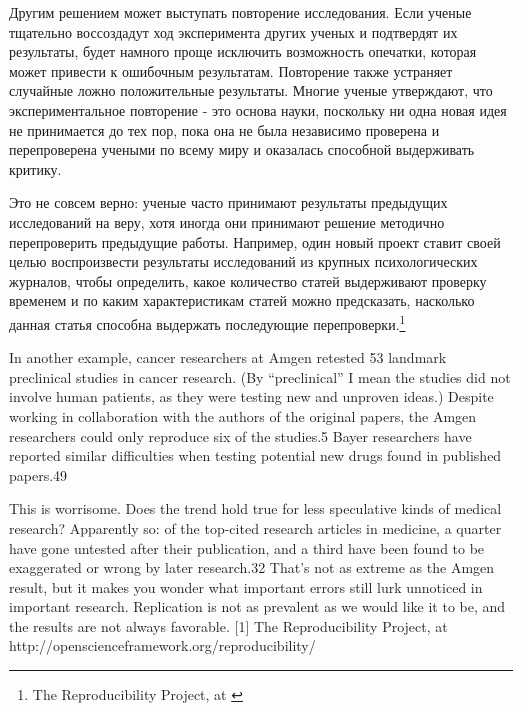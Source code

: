 Другим решением может выступать повторение исследования. Если ученые тщательно воссоздадут ход эксперимента других ученых и подтвердят их результаты, будет намного проще исключить возможность опечатки, которая может привести к ошибочным результатам. Повторение также устраняет случайные ложно положительные результаты. Многие ученые утверждают, что экспериментальное повторение - это основа науки, поскольку ни одна новая идея не принимается до тех пор, пока она не была независимо проверена и перепроверена учеными по всему миру и оказалась способной выдерживать критику.  

Это не совсем верно: ученые часто принимают результаты предыдущих исследований на веру, хотя иногда они принимают решение методично перепроверить предыдущие работы. Например, один новый проект ставит своей целью воспроизвести результаты исследований из крупных психологических журналов, чтобы определить, какое количество статей выдерживают проверку временем и по каким характеристикам статей можно предсказать, насколько данная статья способна выдержать последующие перепроверки.\footnote{The Reproducibility Project, at \href{http://openscienceframework.org/reproducibility/}{}} 

In another example, cancer researchers at Amgen retested 53 landmark preclinical studies in cancer research. (By “preclinical” I mean the studies did not involve human patients, as they were testing new and unproven ideas.) Despite working in collaboration with the authors of the original papers, the Amgen researchers could only reproduce six of the studies.5 Bayer researchers have reported similar difficulties when testing potential new drugs found in published papers.49

This is worrisome. Does the trend hold true for less speculative kinds of medical research? Apparently so: of the top-cited research articles in medicine, a quarter have gone untested after their publication, and a third have been found to be exaggerated or wrong by later research.32 That’s not as extreme as the Amgen result, but it makes you wonder what important errors still lurk unnoticed in important research. Replication is not as prevalent as we would like it to be, and the results are not always favorable.
[1]	The Reproducibility Project, at http://openscienceframework.org/reproducibility/